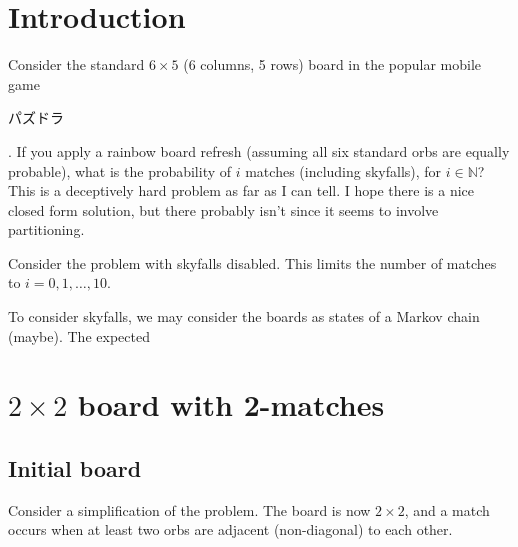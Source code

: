 \documentclass[12pt]{article}
\newcommand{\N}{\mathbb{N}}
\theoremstyle{definition}
\begin{document}
\tableofcontents
\section{Introduction}
Consider the standard $6\times 5$ (6 columns, 5 rows) board in the popular mobile game \begin{CJK}{UTF8}{min}パズドラ\end{CJK}. If you apply a rainbow board refresh (assuming all six standard orbs are equally probable), what is the probability of $i$ matches (including skyfalls), for $i\in\N$?
This is a deceptively hard problem as far as I can tell. I hope there is a nice closed form solution, but there probably isn't since it seems to involve partitioning.

Consider the problem with skyfalls disabled.
This limits the number of matches to $i=0,1,\dots,10$.

To consider skyfalls, we may consider the boards as states of a Markov chain (maybe). The expected 

\section{$2\times2$ board with 2-matches}
\subsection{Initial board}
Consider a simplification of the problem.
The board is now $2 \times 2$, and a match occurs when at least two orbs are adjacent (non-diagonal) to each other.
\end{document}

